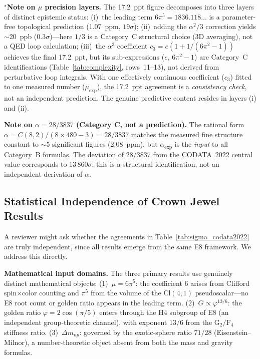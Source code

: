 \documentclass[aps,prd,twocolumn,superscriptaddress,floatfix,nofootinbib]{revtex4-2}
\theoremstyle{definition}
\theoremstyle{remark}
\newcommand{\vp}{\varphi}
\begin{document}
\medskip
\noindent
$^{\star}$\textbf{Note on $\mu$ precision layers.}
\label{sec:mu_precision_layers}
The 17.2~ppt figure decomposes into three layers of distinct epistemic status:
(i)~the leading term $6\pi^5 = 1836.118\ldots$ is a parameter-free topological prediction
(1.07~ppm, $19\sigma$);
(ii)~adding the $\alpha^2/3$ correction yields $\sim$20~ppb ($0.3\sigma$)---here $1/3$ is a
Category~C structural choice (3D averaging), not a QED loop calculation;
(iii)~the $\alpha^3$ coefficient $c_3 = e(1+1/(6\pi^2-1))$ achieves the final 17.2~ppt, but its
sub-expressions ($e$, $6\pi^2-1$) are Category~C identifications (Table~\ref{tab:complexity},
rows~11--13), not derived from perturbative loop integrals. With one effectively continuous
coefficient ($c_3$) fitted to one measured number ($\mu_\text{exp}$), the 17.2~ppt agreement is a
\emph{consistency check}, not an independent prediction. The genuine predictive content resides in
layers (i) and (ii).

\medskip
\noindent
\textbf{Note on $\alpha = 28/3837$ (Category C, not a prediction).}
The rational form $\alpha = C(8,2)/(8\times480-3) = 28/3837$ matches the measured
fine structure constant to $\sim$5 significant figures (2.08~ppm), but $\alpha_\text{exp}$
is the \emph{input} to all Category~B formulas.  The deviation of 28/3837 from the CODATA~2022
central value corresponds to 13\,860$\sigma$; this is a structural identification, not
an independent derivation of $\alpha$.

\subsection{Statistical Independence of Crown Jewel Results}
\label{sec:independence}

A reviewer might ask whether the agreements in Table~\ref{tab:sigma_codata2022}
are truly independent, since all results emerge from the same E8 framework.
We address this directly.

\textbf{Mathematical input domains.}
The three primary results use genuinely distinct mathematical objects:
(1)~$\mu = 6\pi^5$: the coefficient 6 arises from Clifford spin$\times$color
counting and $\pi^5$ from the volume of the $\mathrm{Cl}(4,1)$ pseudoscalar---no
E8 root count or golden ratio appears in the leading term.
(2)~$G \propto \vp^{13/6}$: the golden ratio $\vp = 2\cos(\pi/5)$ enters through
the H4 subgroup of E8 (an independent group-theoretic channel), with exponent
$13/6$ from the $\mathrm{G}_2/\mathrm{F}_4$ stiffness ratio.
(3)~$\Delta m_{np}$: governed by the exotic-sphere ratio $71/28$ (Eisenstein--Milnor),
a number-theoretic object absent from both the mass and gravity formulas.
\end{document}
